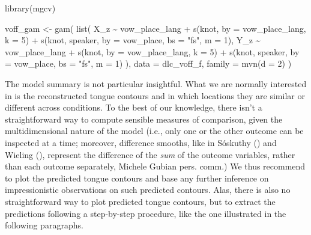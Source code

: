 \documentclass[
  man,
  longtable,
  nolmodern,
  notxfonts,
  notimes,
  colorlinks=true,linkcolor=blue,citecolor=blue,urlcolor=blue]{apa7}
\newenvironment{Shaded}{\begin{snugshade}}{\end{snugshade}}
\newcommand{\AttributeTok}[1]{\textcolor[rgb]{0.40,0.45,0.13}{#1}}
\newcommand{\DecValTok}[1]{\textcolor[rgb]{0.68,0.00,0.00}{#1}}
\newcommand{\FunctionTok}[1]{\textcolor[rgb]{0.28,0.35,0.67}{#1}}
\newcommand{\NormalTok}[1]{\textcolor[rgb]{0.00,0.23,0.31}{#1}}
\newcommand{\OtherTok}[1]{\textcolor[rgb]{0.00,0.23,0.31}{#1}}
\newcommand{\SpecialCharTok}[1]{\textcolor[rgb]{0.37,0.37,0.37}{#1}}
\newcommand{\StringTok}[1]{\textcolor[rgb]{0.13,0.47,0.30}{#1}}
\begin{document}
\begin{Shaded}
\begin{Highlighting}[]
\FunctionTok{library}\NormalTok{(mgcv)}

\NormalTok{voff\_gam }\OtherTok{\textless{}{-}} \FunctionTok{gam}\NormalTok{(}
  \FunctionTok{list}\NormalTok{(}
\NormalTok{    X\_z }\SpecialCharTok{\textasciitilde{}}\NormalTok{ vow\_place\_lang }\SpecialCharTok{+}
      \FunctionTok{s}\NormalTok{(knot, }\AttributeTok{by =}\NormalTok{ vow\_place\_lang, }\AttributeTok{k =} \DecValTok{5}\NormalTok{) }\SpecialCharTok{+}
      \FunctionTok{s}\NormalTok{(knot, speaker, }\AttributeTok{by =}\NormalTok{ vow\_place, }\AttributeTok{bs =} \StringTok{"fs"}\NormalTok{, }\AttributeTok{m =} \DecValTok{1}\NormalTok{),}
\NormalTok{    Y\_z }\SpecialCharTok{\textasciitilde{}}\NormalTok{ vow\_place\_lang }\SpecialCharTok{+}
      \FunctionTok{s}\NormalTok{(knot, }\AttributeTok{by =}\NormalTok{ vow\_place\_lang, }\AttributeTok{k =} \DecValTok{5}\NormalTok{) }\SpecialCharTok{+}
      \FunctionTok{s}\NormalTok{(knot, speaker, }\AttributeTok{by =}\NormalTok{ vow\_place, }\AttributeTok{bs =} \StringTok{"fs"}\NormalTok{, }\AttributeTok{m =} \DecValTok{1}\NormalTok{)}
\NormalTok{  ),}
  \AttributeTok{data =}\NormalTok{ dlc\_voff\_f,}
  \AttributeTok{family =} \FunctionTok{mvn}\NormalTok{(}\AttributeTok{d =} \DecValTok{2}\NormalTok{)}
\NormalTok{)}
\end{Highlighting}
\end{Shaded}

The model summary is not particular insightful. What we are normally
interested in is the reconstructed tongue contours and in which
locations they are similar or different across conditions. To the best
of our knowledge, there isn't a straightforward way to compute sensible
measures of comparison, given the multidimensional nature of the model
(i.e., only one or the other outcome can be inspected at a time;
moreover, difference smooths, like in Sóskuthy
() and Wieling
(), represent the difference of the
\emph{sum} of the outcome variables, rather than each outcome
separately, Michele Gubian pers. comm.) We thus recommend to plot the
predicted tongue contours and base any further inference on
impressionistic observations on such predicted contours. Alas, there is
also no straightforward way to plot predicted tongue contours, but to
extract the predictions following a step-by-step procedure, like the one
illustrated in the following paragraphs.
\end{document}

